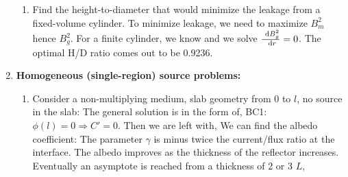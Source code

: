 \documentclass{school-22.211-notes}
\begin{document}
\begin{enumerate}
\begin{enumerate}
  \item Find the height-to-diameter that would minimize the leakage from a fixed-volume cylinder. To minimize leakage, we need to maximize $B_m^2$ hence $B_g^2$. For a finite cylinder, we know
    and we solve $\frac{\mbox{ }\mathrm{d} B_g^2}{\mbox{ }\mathrm{d} r} = 0$. The optimal H/D ratio comes out to be 0.9236. 
    
  \end{enumerate}


\clearpage  
\item \textbf{Homogeneous (single-region) source problems:}
  \begin{enumerate}
  \item Consider a non-multiplying medium, slab geometry from $0$ to $l$, no source in the slab: 
    The general solution is in the form of, 
    BC1: $\phi(l) = 0 \Rightarrow C' = 0$. Then we are left with, 
    We can find the albedo coefficient: 
    The parameter $\gamma$ is minus twice the current/flux ratio at the interface. The albedo improves as the thickness of the reflector increases. Eventually an asymptote is reached from a thickness of 2 or 3 $L$, 


\end{enumerate}
\end{enumerate}
\end{document}
